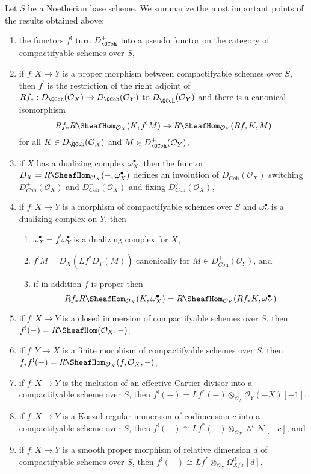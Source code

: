 \medskip\noindent
Let $S$ be a Noetherian base scheme.
We summarize the most important points of the results obtained above:
\begin{enumerate}
\item the functors $f^!$ turn $D_\QCoh^+$ into a pseudo functor
on the category of compactifyable schemes over $S$,
\item if $f : X \to Y$ is a proper morphism between compactifyable
schemes over $S$, then $f^!$ is the restriction of the right adjoint of
$Rf_* : D_\QCoh(\mathcal{O}_X) \to D_\QCoh(\mathcal{O}_Y)$
to $D_\QCoh^+(\mathcal{O}_Y)$ and there is a canonical isomorphism
$$
Rf_*R\SheafHom_{\mathcal{O}_X}(K, f^!M)
\to
R\SheafHom_{\mathcal{O}_Y}(Rf_*K, M)
$$
for all $K \in D_\QCoh(\mathcal{O}_X)$ and $M \in D_\QCoh^+(\mathcal{O}_Y)$,
\item if $X$ has a dualizing complex $\omega_X^\bullet$, then the functor
$D_X = R\SheafHom_{\mathcal{O}_X}(-, \omega_X^\bullet)$
defines an involution of $D_{\textit{Coh}}(\mathcal{O}_X)$
switching $D_{\textit{Coh}}^+(\mathcal{O}_X)$ and
$D_{\textit{Coh}}^-(\mathcal{O}_X)$ and fixing
$D_{\textit{Coh}}^b(\mathcal{O}_X)$,
\item if $f : X \to Y$ is a morphism of compactifyable
schemes over $S$ and $\omega_Y^\bullet$ is a dualizing complex on $Y$,
then
\begin{enumerate}
\item $\omega_X^\bullet = f^!\omega_Y^\bullet$ is a dualizing complex for $X$,
\item $f^!M = D_X(Lf^*D_Y(M))$ canonically for
$M \in D_{\textit{Coh}}^+(\mathcal{O}_Y)$, and
\item if in addition $f$ is proper then
$$
Rf_*R\SheafHom_{\mathcal{O}_X}(K, \omega_X^\bullet) =
R\SheafHom_{\mathcal{O}_Y}(Rf_*K, \omega_Y^\bullet)
$$
\end{enumerate}
\item if $f : X \to Y$ is a closed immersion of compactifyable schemes
over $S$, then $f^!(-) = R\SheafHom(\mathcal{O}_X, -)$,
\item if $f : Y \to X$ is a finite morphism of compactifyable schemes
over $S$, then $f_*f^!(-) = R\SheafHom_{\mathcal{O}_X}(f_*\mathcal{O}_X, -)$,
\item if $f : X \to Y$ is the inclusion of an effective Cartier divisor
into a compactifyable scheme over $S$, then
$f^!(-) = Lf^*(-) \otimes_{\mathcal{O}_X} \mathcal{O}_Y(-X)[-1]$,
\item if $f : X \to Y$ is a Koszul regular immersion of codimension $c$
into a compactifyable scheme over $S$, then
$f^!(-) \cong Lf^*(-) \otimes_{\mathcal{O}_X} \wedge^c\mathcal{N}[-c]$, and
\item if $f : X \to Y$ is a smooth proper morphism of relative dimension $d$
of compactifyable schemes over $S$, then
$f^!(-) \cong Lf^*  \otimes_{\mathcal{O}_X} \Omega^d_{X/Y}[d]$.
\end{enumerate}
